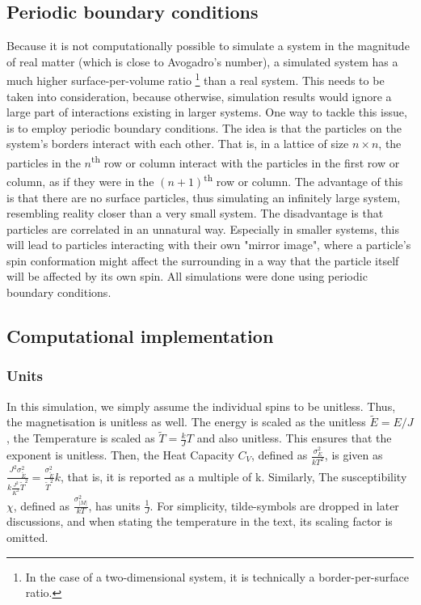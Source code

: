 \documentclass[10pt,a4paper]{article}
\begin{document}
\subsection{Periodic boundary conditions}
Because it is not computationally possible to simulate a system in the magnitude of real matter (which is close to Avogadro's number), a simulated system has a much higher surface-per-volume ratio \footnote{In the case of a two-dimensional system, it is technically a border-per-surface ratio.} than a real system. This needs to be taken into consideration, because otherwise, simulation results would ignore a large part of interactions existing in larger systems. One way to tackle this issue, is to employ periodic boundary conditions. The idea is that the particles on the system's borders interact with each other. That is, in a lattice of size $n\times n$, the particles in the $n$\textsuperscript{th} row or column interact with the particles in the first row or column, as if they were in the  $(n+1)$\textsuperscript{th} row or column. The advantage of this is that there are no surface particles, thus simulating an infinitely large system, resembling reality closer than a very small system. The disadvantage is that particles are correlated in an unnatural way. Especially in smaller systems, this will lead to particles interacting with their own "mirror image", where a particle's spin conformation might affect the surrounding in a way that the particle itself will be affected by its own spin.
All simulations were done using periodic boundary conditions.
\subsection{Computational implementation}

\subsubsection{Units}
In this simulation, we simply assume the individual spins to be unitless. Thus, the magnetisation is unitless as well.
The energy is scaled as the unitless $\tilde{E}=E/J$, the Temperature is scaled as  $\tilde{T}=\frac{k}{J}T$ and also unitless. This ensures that the exponent is unitless.
Then, the Heat Capacity $C_V$, defined as $\frac{\sigma_E^2}{kT^2}$, is given as $\frac{J^2\sigma^2_{\tilde{E}}}{k\frac{J^2}{K^2} \tilde{T}^2}=\frac{\sigma^2_{\tilde{E}}}{\tilde{T}^2}k$, that is, it is reported as a multiple of k. 
Similarly, The susceptibility $\chi$, defined as $\frac{\sigma_{|M|}^2}{kT}$, has units $\frac{1}{J}$. For simplicity, tilde-symbols are dropped in later discussions, and when stating the temperature in the text, its scaling factor is omitted.
\end{document}
